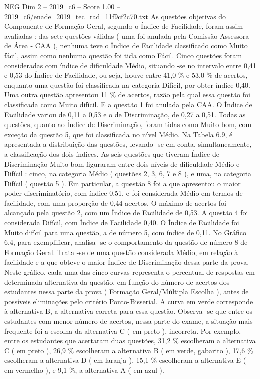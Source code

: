 \begin{textsample}{NEG Dim 2 – 2019\_c6 – Score 1.00 – 2019\_c6/enade\_2019\_tec\_rad\_11f9cf2c70.txt}
As questões objetivas do Componente de Formação Geral, segundo o Índice de Facilidade, foram assim avaliadas : das sete questões válidas ( uma foi anulada pela Comissão Assessora de Área - CAA ), nenhuma teve o Índice de Facilidade classificado como Muito fácil, assim como nenhuma questão foi tida como Fácil.
Cinco questões foram consideradas com índice de dificuldade Médio, situando -se no intervalo entre 0,41 e 0,53 do Índice de Facilidade, ou seja, houve entre 41,0 \% e 53,0 \% de acertos, enquanto uma questão foi classificada na categoria Difícil, por obter índice 0,40.
Uma outra questão apresentou 11 \% de acertos, razão pela qual essa questão foi classificada como Muito difícil.
E a questão 1 foi anulada pela CAA.
O Índice de Facilidade variou de 0,11 a 0,53 e o de Discriminação, de 0,27 a 0,51.
Todas as questões, quanto ao Índice de Discriminação, foram tidas como Muito bom, com exceção da questão 5, que foi classificada no nível Médio.
Na Tabela 6.9, é apresentada a distribuição das questões, levando -se em conta, simultaneamente, a classificação dos dois índices.
As seis questões que tiveram Índice de Discriminação Muito bom figuraram entre dois níveis de dificuldade Médio e Difícil : cinco, na categoria Médio ( questões 2, 3, 6, 7 e 8 ), e uma, na categoria Difícil ( questão 5 ).
Em particular, a questão 8 foi a que apresentou o maior poder discriminatório, com índice 0,51, e foi considerada Médio em termos de facilidade, com uma proporção de 0,44 acertos.
O máximo de acertos foi alcançado pela questão 2, com um Índice de Facilidade de 0,53.
A questão 4 foi considerada Difícil, com Índice de Facilidade 0,40.
O Índice de Facilidade foi Muito difícil para uma questão, a de número 5, com índice de 0,11.
No Gráfico 6.4, para exemplificar, analisa -se o comportamento da questão de número 8 de Formação Geral.
Trata -se de uma questão considerada Médio, em relação à facilidade e a que obteve o maior Índice de Discriminação dessa parte da prova.
Neste gráfico, cada uma das cinco curvas representa o percentual de respostas em determinada alternativa da questão, em função do número de acertos dos estudantes nessa parte da prova ( Formação Geral/Múltipla Escolha ), antes de possíveis eliminações pelo critério Ponto-Bisserial.
A curva em verde corresponde à alternativa B, a alternativa correta para essa questão.
Observa -se que entre os estudantes com menor número de acertos, nessa parte do exame, a situação mais frequente foi a escolha da alternativa C ( em preto ), incorreta.
Por exemplo, entre os estudantes que acertaram duas questões, 31,2 \% escolheram a alternativa C ( em preto ), 26,9 \% escolheram a alternativa B ( em verde, gabarito ), 17,6 \% escolheram a alternativa D ( em laranja ), 15,1 \% escolheram a alternativa E ( em vermelho ), e 9,1 \%, a alternativa A ( em azul ).

\end{textsample}
